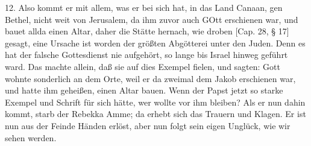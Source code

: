 12. Also kommt er mit allem, was er bei sich hat, in das Land Canaan, gen Bethel, nicht weit von Jerusalem, da ihm zuvor auch GOtt erschienen war, und bauet allda einen Altar, daher die Stätte hernach, wie droben [Cap. 28, § 17] gesagt, eine Ursache ist worden der größten Abgötterei unter den Juden. Denn es hat der falsche Gottesdienst nie aufgehört, so lange bis Israel hinweg geführt ward. Das machte allein, daß sie auf dies Exempel fielen, und sagten: Gott wohnte sonderlich an dem Orte, weil er da zweimal dem Jakob erschienen war, und hatte ihm geheißen, einen Altar bauen. Wenn der Papst jetzt so starke Exempel und Schrift
für sich hätte, wer wollte vor ihm bleiben? Als er nun dahin kommt, starb der Rebekka Amme; da erhebt sich das Trauern und Klagen. Er ist nun aus der Feinde Händen erlöst, aber nun folgt sein eigen Unglück, wie wir sehen werden.


